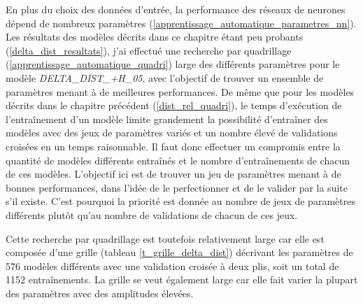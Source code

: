 
\label{delta_dist_quadri}

\par En plus du choix des données d'entrée, la performance des réseaux de neurones dépend de nombreux paramètres (\ref{apprentissage_automatique_parametres_nn}). Les résultats des modèles décrits dans ce chapitre étant peu probants (\ref{delta_dist_resultats}), j'ai effectué une recherche par quadrillage (\ref{apprentissage_automatique_quadri}) large des différents paramètres pour le modèle \emph{DELTA\_DIST\_+H\_05}, avec l'objectif de trouver un ensemble de paramètres menant à de meilleures performances. De même que pour les modèles décrits dans le chapitre précédent (\ref{dist_rel_quadri}), le temps d'exécution de l'entraînement d'un modèle limite grandement la possibilité d'entraîner des modèles avec des jeux de paramètres variés et un nombre élevé de validations croisées en un temps raisonnable. Il faut donc effectuer un compromis entre la quantité de modèles différents entraînés et le nombre d'entraînements de chacun de ces modèles. L'objectif ici est de trouver un jeu de paramètres menant à de bonnes performances, dans l'idée de le perfectionner et de le valider par la suite s'il existe. C'est pourquoi la priorité est donnée au nombre de jeux de paramètres différents plutôt qu'au nombre de validations de chacun de ces jeux.

\par Cette recherche par quadrillage est toutefois relativement large car elle est composée d'une grille (tableau \ref{t_grille_delta_dist}) décrivant les paramètres de 576 modèles différents avec une validation croisée à deux plis, soit un total de 1152 entraînements. La grille se veut également large car elle fait varier la plupart des paramètres avec des amplitudes élevées.

